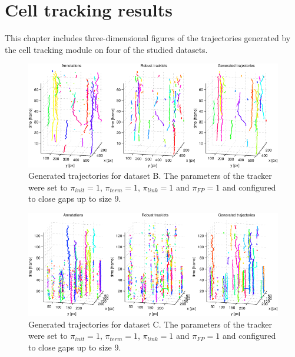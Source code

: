 \chapter{Cell tracking results}
	\label{app:appendix_trackingresults}
	
	This chapter includes three-dimensional figures of the trajectories generated by the cell tracking module on four of the studied datasets.

\begin{figure}[h]
	\includegraphics[width=\textwidth]{images/fig_results_tracker_dataset_2}
	\caption{Generated trajectories for dataset B. The parameters of the tracker were set to $\pi_{init}=1$, $\pi_{term}=1$, $\pi_{link}=1$ and $\pi_{FP}=1$ and configured to close gaps up to size 9.}
	\label{fig:results_tracker_dataset_2}
\end{figure}


\begin{figure}[h]
	\includegraphics[width=\textwidth]{images/fig_results_tracker_dataset_3}
	\caption{Generated trajectories for dataset C. The parameters of the tracker were set to $\pi_{init}=1$, $\pi_{term}=1$, $\pi_{link}=1$ and $\pi_{FP}=1$ and configured to close gaps up to size 9.}
	\label{fig:results_tracker_dataset_3}
\end{figure}

